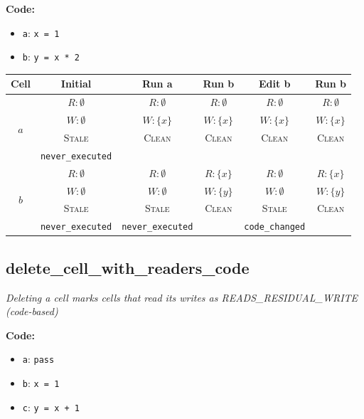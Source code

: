 \documentclass{article}
\begin{document}
\textbf{Code:}
\begin{itemize}
  \item \texttt{a}: \verb|x = 1|
  \item \texttt{b}: \verb|y = x * 2|
\end{itemize}

\begin{center}
\small
\begin{tabular}{|c|c|c|c|c|c|}
\hline
\textbf{Cell} & \textbf{Initial} & \textbf{Run a} & \textbf{Run b} & \textbf{Edit b} & \textbf{Run b} \\
\hline
\multirow{4}{*}{$a$}
  & $R: \emptyset$ & $R: \emptyset$ & $R: \emptyset$ & $R: \emptyset$ & $R: \emptyset$ \\
  & $W: \emptyset$ & $W: \{x\}$ & $W: \{x\}$ & $W: \{x\}$ & $W: \{x\}$ \\
  & \textsc{Stale} & \textsc{Clean} & \textsc{Clean} & \textsc{Clean} & \textsc{Clean} \\
  & \footnotesize\texttt{never\_executed} &  &  &  &  \\
\hline
\multirow{4}{*}{$b$}
  & $R: \emptyset$ & $R: \emptyset$ & $R: \{x\}$ & $R: \emptyset$ & $R: \{x\}$ \\
  & $W: \emptyset$ & $W: \emptyset$ & $W: \{y\}$ & $W: \emptyset$ & $W: \{y\}$ \\
  & \textsc{Stale} & \textsc{Stale} & \textsc{Clean} & \textsc{Stale} & \textsc{Clean} \\
  & \footnotesize\texttt{never\_executed} & \footnotesize\texttt{never\_executed} &  & \footnotesize\texttt{code\_changed} &  \\
\hline
\end{tabular}
\end{center}


\subsection{delete\_cell\_with\_readers\_code}
\textit{Deleting a cell marks cells that read its writes as READS\_RESIDUAL\_WRITE (code-based)}

\textbf{Code:}
\begin{itemize}
  \item \texttt{a}: \verb|pass|
  \item \texttt{b}: \verb|x = 1|
  \item \texttt{c}: \verb|y = x + 1|
\end{itemize}
\end{document}
